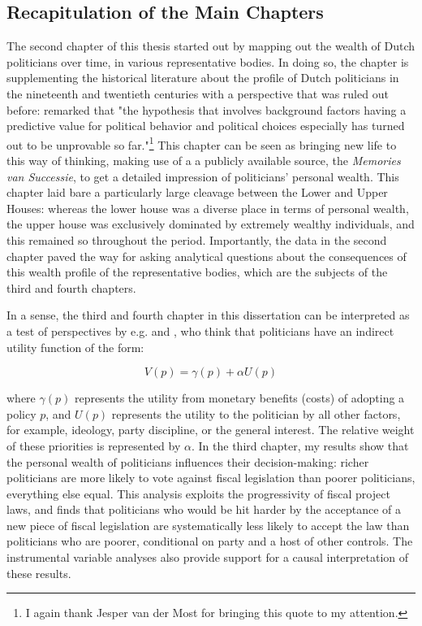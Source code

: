 \subsection{Recapitulation of the Main Chapters}
The second chapter of this thesis started out by mapping out the wealth of Dutch politicians over time, in various representative bodies. In doing so, the chapter is supplementing the historical literature about the profile of Dutch politicians in the nineteenth and twentieth centuries \citep{van1983toegang, secker1991ministers, van1999eerste, oomen2020werk} with a perspective that was ruled out before: \cite{van1983toegang} remarked that "the hypothesis that involves background factors having a predictive value for political behavior and political choices especially has turned out to be unprovable so far."\footnote{I again thank Jesper van der Most for bringing this quote to my attention.} This chapter can be seen as bringing new life to this way of thinking, making use of a a publicly available source, the \textit{Memories van Successie}, to get a detailed impression of politicians' personal wealth. This chapter laid bare a particularly large cleavage between the Lower and Upper Houses: whereas the lower house was a diverse place in terms of personal wealth, the upper house was exclusively dominated by extremely wealthy individuals, and this remained so throughout the period. Importantly, the data in the second chapter paved the way for asking analytical questions about the consequences of this wealth profile of the representative bodies, which are the subjects of the third and fourth chapters. 

In a sense, the third and fourth chapter in this dissertation can be interpreted as a test of perspectives by e.g. \cite{tahoun2019personal} and \cite{grossman1996electoral}, who think that politicians have an indirect utility function of the form:

\begin{equation}\label{eq:utility}
    V(p) = \gamma (p) + \alpha U (p)
\end{equation}

where $\gamma (p)$ represents the utility from monetary benefits (costs) of adopting a policy $p$, and $U (p)$ represents the utility to the politician by all other factors, for example, ideology, party discipline, or the general interest. The relative weight of these priorities is represented by $\alpha$. In the third chapter, my results show that the personal wealth of politicians influences their decision-making: richer politicians are more likely to vote against fiscal legislation than poorer politicians, everything else equal. This analysis exploits the progressivity of fiscal project laws, and finds that politicians who would be hit harder by the acceptance of a new piece of fiscal legislation are systematically less likely to accept the law than politicians who are poorer, conditional on party and a host of other controls. The instrumental variable analyses also provide support for a causal interpretation of these results. 

